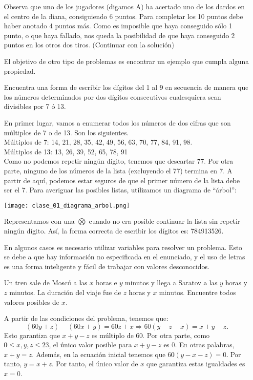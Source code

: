 \documentclass[11pt]{scrartcl}
\begin{document}
Observa que uno de los jugadores (digamos A) ha acertado uno de los dardos en el centro de la diana, consiguiendo 6 puntos. Para completar los 10 puntos debe haber anotado 4 puntos más. Como es imposible que haya conseguido sólo 1 punto, o que haya fallado, nos queda la posibilidad de que haya conseguido 2 puntos en los otros dos tiros. (Continuar con la solución)

El objetivo de otro tipo de problemas es encontrar un ejemplo que cumpla alguna propiedad.

\begin{example}
Encuentra una forma de escribir los dígitos del 1 al 9 en secuencia de manera que los números determinados por dos dígitos consecutivos cualesquiera sean divisibles por 7 ó 13.
\end{example}

En primer lugar, vamos a enumerar todos los números de dos cifras que son múltiplos de 7 o de 13. Son los siguientes.\\
Múltiplos de 7: 14, 21, 28, 35, 42, 49, 56, 63, 70, 77, 84, 91, 98.\\
Múltiplos de 13: 13, 26, 39, 52, 65, 78, 91\\

Como no podemos repetir ningún dígito, tenemos que descartar 77. Por otra parte, ninguno de los números de la lista (excluyendo el 77) termina en 7. A partir de aquí, podemos estar seguros de que el primer número de la lista debe ser el 7. Para averiguar las posibles listas, utilizamos un diagrama de ``árbol'':

\begin{center}
    \texttt{[image: clase\_01\_diagrama\_arbol.png]}
\end{center}
Representamos con una \(\bigotimes\) cuando no era posible continuar la lista sin repetir ningún dígito. Así, la forma correcta de escribir los dígitos es: 784913526.

En algunos casos es necesario utilizar variables para resolver un problema. Esto se debe a que hay información no especificada en el enunciado, y el uso de letras es una forma inteligente y fácil de trabajar con valores desconocidos.

\begin{example}[Rusia 1995]
Un tren sale de Moscú a las $x$ horas e $y$ minutos y llega a Saratov a las $y$ horas y $z$ minutos. La duración del viaje fue de $z$ horas y $x$ minutos. Encuentre todos valores posibles de $x$.    
\end{example}
A partir de las condiciones del problema, tenemos que:
\[(60y+z)-(60x+y)=60z+x\Rightarrow 60(y-z-x)=x+y-z.\]
Esto garantiza que $x + y - z$ es múltiplo de 60. Por otra parte, como $0\le x, y, z\le 23$, el único valor posible para $x + y - z$ es 0. En otras palabras, $x + y = z$. Además, en la ecuación inicial tenemos que $60(y - x - z) = 0$. Por tanto, $y = x + z$. Por tanto, el único valor de $x$ que garantiza estas igualdades es $x = 0$.\\
\end{document}
